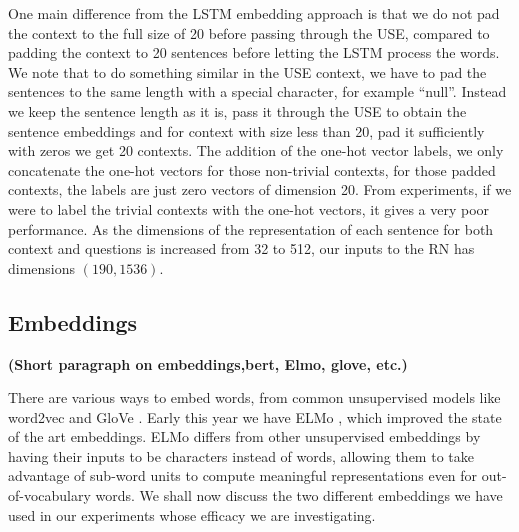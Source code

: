 \documentclass{article}
\begin{document}
One main difference from the LSTM embedding approach is that we do not pad the context to the full size of 20 before passing through the USE, compared to padding the context to 20 sentences before letting the LSTM process the words. We note that to do something similar in the USE context, we have to pad the sentences to the same length with a special character, for example ``null''. Instead we keep the sentence length as it is, pass it through the USE to obtain the sentence embeddings and for context with size less than 20, pad it sufficiently with zeros we get 20 contexts. The addition of the one-hot vector labels, we only concatenate the one-hot vectors for those non-trivial contexts, for those padded contexts, the labels are just zero vectors of dimension 20. From experiments, if we were to label the trivial contexts with the one-hot vectors, it gives a very poor performance. As the dimensions of the representation of each sentence for both context and questions is increased from 32 to 512, our inputs to the RN has dimensions $(190,1536)$. 








\subsection{Embeddings}
\textbf{(Short paragraph on embeddings,bert,  Elmo, glove, etc.)}

There are various ways to embed words, from common unsupervised models like word2vec \cite{word2vec} and GloVe \cite{pennington2014glove}. Early this year we have ELMo \cite{N18-1202}, which improved the state of the art embeddings. ELMo differs from other unsupervised embeddings by having their inputs to be characters instead of words, allowing them to take advantage of sub-word units to compute meaningful representations even for out-of-vocabulary words. We shall now discuss the two different embeddings we have used in our experiments whose efficacy we are investigating.
\end{document}
